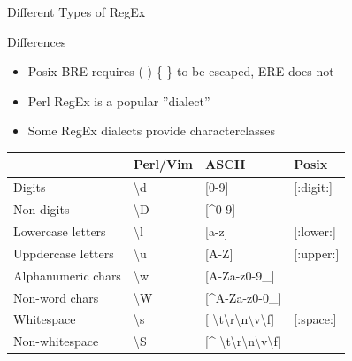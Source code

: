 \documentclass[ignorenonframetext,xcolor=x11names]{beamer}
\begin{document}
\begin{frame}[label=advanced]{Different Types of RegEx}
\begin{block}{Differences}
\begin{itemize}
  \item Posix BRE requires ( ) \{ \} to be escaped, ERE does not
  \item Perl RegEx is a popular ''dialect''
  \item Some RegEx dialects provide characterclasses
\end{itemize}
\end{block}
\centering
\renewcommand{\arraystretch}{1.25}

\footnotesize
\begin{tabular}{l|l|l|l} 
                  & \textbf{Perl/Vim} & \textbf{ASCII} & \textbf{Posix} \\ \hline
Digits            & \textbackslash d & [0-9]  & [:digit:]  \\
Non-digits        & \textbackslash D & [\textasciicircum 0-9] & \\
Lowercase letters & \textbackslash l & [a-z] & [:lower:] \\
Uppdercase letters & \textbackslash u & [A-Z] & [:upper:] \\
Alphanumeric chars & \textbackslash w & [A-Za-z0-9\_] & \\
Non-word chars    & \textbackslash W & [\textasciicircum A-Za-z0-0\_] & \\
Whitespace        & \textbackslash s & [ \textbackslash t\textbackslash r\textbackslash n\textbackslash v\textbackslash f] & [:space:] \\
Non-whitespace    & \textbackslash S & [\textasciicircum{ } \textbackslash t\textbackslash r\textbackslash n\textbackslash v\textbackslash f] & \\ \hline
\end{tabular}
\end{frame}
\end{document}
